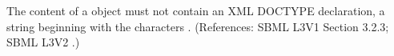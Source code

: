 The content of a \Notes object must not contain an XML
DOCTYPE declaration, \ie a string beginning with the characters
.  (References: SBML L3V1 Section 3.2.3; SBML L3V2 .)
